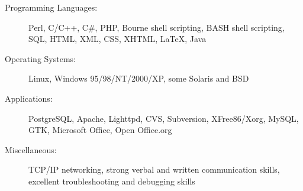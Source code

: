 \documentclass[11pt]{article}
\begin{document}
\begin{description}
\item[Programming Languages:]
Perl, C/C++, C\#, PHP, Bourne shell scripting, BASH shell scripting, SQL, HTML, XML, CSS, XHTML, \LaTeX, Java
\item[Operating Systems:]
Linux, Windows 95/98/NT/2000/XP, some Solaris and BSD
\item[Applications:]
PostgreSQL, Apache, Lighttpd, CVS, Subversion, XFree86/Xorg, MySQL, GTK, Microsoft Office, Open Office.org
\item[Miscellaneous:]
TCP/IP networking, strong verbal and written communication skills, excellent troubleshooting and debugging skills
\end{description}
\end{document}
